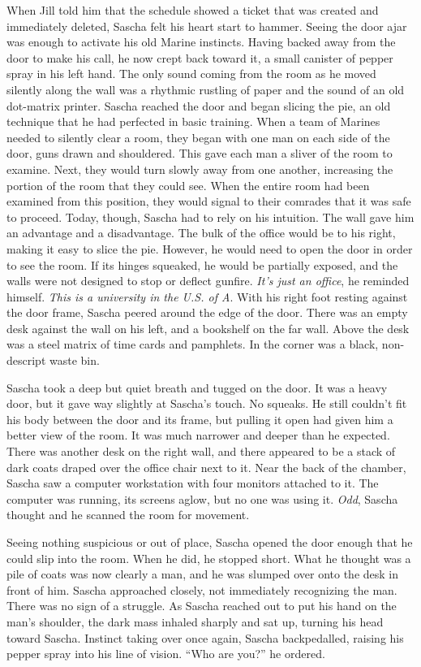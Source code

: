 \documentclass[12pt]{book}
\begin{document}
When Jill told him that the schedule showed a ticket that was created and immediately deleted, Sascha felt his heart start to hammer.  Seeing the door ajar was enough to activate his old Marine instincts.  Having backed away from the door to make his call, he now crept back toward it, a small canister of pepper spray in his left hand.  The only sound coming from the room as he moved silently along the wall was a rhythmic rustling of paper and the sound of an old dot-matrix printer.  Sascha reached the door and began slicing the pie, an old technique that he had perfected in basic training.  When a team of Marines needed to silently clear a room, they began with one man on each side of the door, guns drawn and shouldered.  This gave each man a sliver of the room to examine.  Next, they would turn slowly away from one another, increasing the portion of the room that they could see.  When the entire room had been examined from this position, they would signal to their comrades that it was safe to proceed.  Today, though, Sascha had to rely on his intuition.  The wall gave him an advantage and a disadvantage.  The bulk of the office would be to his right, making it easy to slice the pie.  However, he would need to open the door in order to see the room.  If its hinges squeaked, he would be partially exposed, and the walls were not designed to stop or deflect gunfire.  \emph{It's just an office}, he reminded himself.  \emph{This is a university in the U.S. of A}.  With his right foot resting against the door frame, Sascha peered around the edge of the door.  There was an empty desk against the wall on his left, and a bookshelf on the far wall.  Above the desk was a steel matrix of time cards and pamphlets.  In the corner was a black, non-descript waste bin.

Sascha took a deep but quiet breath and tugged on the door.  It was a heavy door, but it gave way slightly at Sascha's touch.  No squeaks.  He still couldn't fit his body between the door and its frame, but pulling it open had given him a better view of the room.  It was much narrower and deeper than he expected.  There was another desk on the right wall, and there appeared to be a stack of dark coats draped over the office chair next to it.  Near the back of the chamber, Sascha saw a computer workstation with four monitors attached to it.  The computer was running, its screens aglow, but no one was using it.  \emph{Odd}, Sascha thought and he scanned the room for movement.

Seeing nothing suspicious or out of place, Sascha opened the door enough that he could slip into the room.  When he did, he stopped short.  What he thought was a pile of coats was now clearly a man, and he was slumped over onto the desk in front of him.  Sascha approached closely, not immediately recognizing the man.  There was no sign of a struggle.  As Sascha reached out to put his hand on the man's shoulder, the dark mass inhaled sharply and sat up, turning his head toward Sascha.  Instinct taking over once again, Sascha backpedalled, raising his pepper spray into his line of vision.  ``Who are you?'' he ordered.
\end{document}
